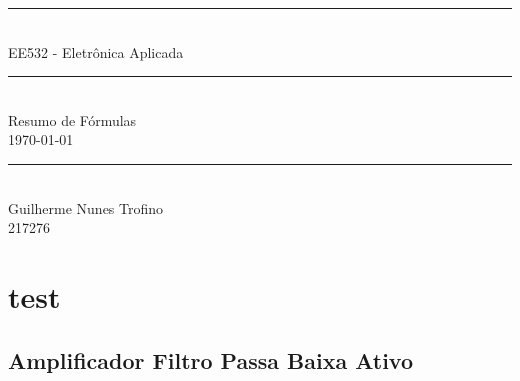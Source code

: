 \documentclass{article}
\begin{document}
    \begin{titlepage}
        \begin{center}
            \rule{450pt}{0.5pt}\\[4mm]
            {\Huge EE532 - Eletrônica Aplicada}\\
            \rule{450pt}{0.5pt}\\[2mm]
            {\Large Resumo de Fórmulas}\\[200mm]
            \today\\
            \rule{250pt}{0.5pt}\\
            {\large Guilherme Nunes Trofino}\\
            {\large 217276}\\
        \end{center}
    \end{titlepage}
\newpage

    \section{test}
    \subsection{Amplificador Filtro Passa Baixa Ativo}
\end{document}
